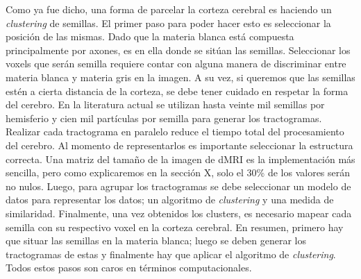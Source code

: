 Como ya fue dicho, una forma de parcelar la corteza cerebral es haciendo un 
\textit{clustering} de semillas.  El primer paso para poder hacer esto es seleccionar
la posici\'on de las mismas. Dado que la materia blanca est\'a compuesta
principalmente por axones, es en ella donde se sit\'uan las semillas. Seleccionar
los voxels que ser\'an semilla requiere contar con alguna manera de discriminar
entre materia blanca y materia gris en la imagen. A su vez, si queremos que las
semillas est\'en a cierta distancia de la corteza, se debe tener cuidado en
respetar la forma del cerebro. En la literatura actual se utilizan hasta veinte
mil semillas por hemisferio \cite{Moreno-Dominguez2014} y cien mil part\'iculas 
por semilla \cite{Anwander2006} para generar los tractogramas. Realizar cada
tractograma en paralelo reduce el tiempo total del procesamiento del cerebro. Al
momento de representarlos es importante seleccionar la estructura correcta. Una 
matriz del tama\~no de la imagen de dMRI es la implementaci\'on m\'as sencilla, 
pero como explicaremos en la secci\'on X, solo el 30\% de los valores ser\'an no
nulos. Luego, para agrupar los tractogramas se debe seleccionar un modelo de datos
para representar los datos; un algoritmo de \textit{clustering} y una medida de
similaridad. Finalmente, una vez obtenidos los clusters, es necesario mapear cada
semilla con su respectivo voxel en la corteza cerebral. En resumen, primero hay 
que situar las semillas en la materia blanca; luego se deben generar los 
tractogramas de estas y finalmente hay que aplicar el algoritmo de \textit{clustering}. 
Todos estos pasos son caros en t\'erminos computacionales. \\

